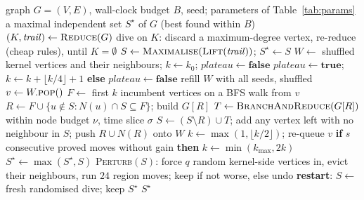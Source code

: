 \documentclass[pdflatex,sn-mathphys-num]{sn-jnl}
\theoremstyle{thmstyleone}%
\theoremstyle{thmstyletwo}%
\begin{document}
\begin{algorithm}
\caption{\textsc{Cascade}: static region-move search}
\label{alg:cascade}
\small
\begin{algorithmic}[1]
\Require graph $G=(V,E)$, wall-clock budget $B$, seed; parameters of Table~\ref{tab:params}
\Ensure a maximal independent set $S^\star$ of $G$ (best found within $B$)
\State $(K,\mathit{trail}) \gets \textsc{Reduce}(G)$ 
\State dive on $K$: discard a maximum-degree vertex, re-reduce (cheap rules), until $K=\emptyset$
\State $S \gets \textsc{Maximalise}(\textsc{Lift}(\mathit{trail}))$;\; $S^\star \gets S$
\State $W \gets$ shuffled kernel vertices and their neighbours;\; $k \gets k_0$;\; $\mathit{plateau}\gets\textbf{false}$
  \Repeat {}
     
       $\mathit{plateau}\gets\textbf{true}$;\; $k \gets k + \lfloor k/4\rfloor + 1$ \textbf{else} $\mathit{plateau}\gets\textbf{false}$
      \EndIf
      \State refill $W$ with all seeds, shuffled
    \EndIf
    \State $v \gets W.\textsc{pop}()$
    \State $F \gets$ first $k$ incumbent vertices on a BFS walk from $v$ 
    \State $R \gets F \cup \{u \notin S : N(u) \cap S \subseteq F\}$;\; build $G[R]$
    \State $T \gets \textsc{BranchAndReduce}(G[R])$ within node budget $\nu$, time slice $\sigma$
      \State $S \gets (S \setminus R) \cup T$;\; add any vertex left with no neighbour in $S$; push $R\cup N(R)$ onto $W$
    \EndIf
     $k \gets \max(1,\lfloor k/2\rfloor)$;\; re-queue $v$
     \textbf{if} $s$ consecutive proved moves without gain \textbf{then} $k \gets \min(k_{\max},2k)$
    \EndIf
  \State $S^\star \gets \max(S^\star, S)$
  \State \textsc{Perturb}$(S)$: force $q$ random kernel-side vertices in, evict their neighbours, run $24$ region moves; keep if not worse, else undo
    \State \textbf{restart}: $S \gets$ fresh randomised dive; keep $S^\star$
  \EndIf
\EndWhile
\State \Return $S^\star$
\end{algorithmic}
\end{algorithm}
\end{document}
